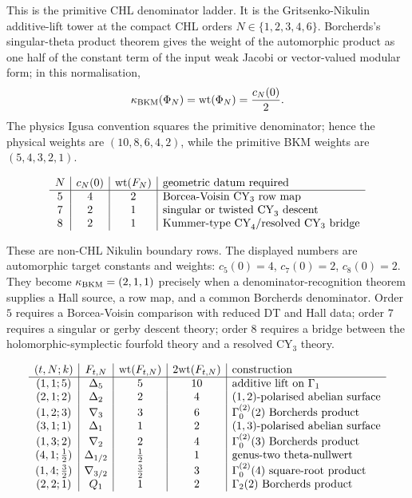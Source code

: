 This is the primitive CHL denominator ladder.  It is the
Gritsenko-Nikulin additive-lift tower at the compact CHL orders
$N\in\{1,2,3,4,6\}$.  Borcherds's singular-theta product theorem gives
the weight of the automorphic product as one half of the constant term
of the input weak Jacobi or vector-valued modular form; in this
normalisation,
\[
  \kappa_{\mathrm{BKM}}(\Phi_N)=\mathrm{wt}(\Phi_N)=\frac{c_N(0)}{2}.
\]
The physics Igusa convention squares the primitive denominator; hence
the physical weights are $(10,8,6,4,2)$, while the primitive BKM
weights are $(5,4,3,2,1)$.

\[
\begin{array}{c|c|c|l}
N & c_N(0) & \wt(F_N) & \text{geometric datum required}\\\hline
5 & 4 & 2 & \text{Borcea-Voisin CY}_3\ \text{row map}\\
7 & 2 & 1 & \text{singular or twisted CY}_3\ \text{descent}\\
8 & 2 & 1 & \text{Kummer-type CY}_4/\text{resolved CY}_3\ \text{bridge}
\end{array}
\]

These are non-CHL Nikulin boundary rows.  The displayed numbers are
automorphic target constants and weights:
$c_5(0)=4$, $c_7(0)=2$, $c_8(0)=2$.  They become
$\kappa_{\mathrm{BKM}}=(2,1,1)$ precisely when a denominator-recognition theorem supplies
a Hall source, a row map, and a common Borcherds denominator.  Order
$5$ requires a Borcea-Voisin comparison with reduced DT and Hall
data; order $7$ requires a singular or gerby descent theory; order $8$
requires a bridge between the holomorphic-symplectic fourfold theory
and a resolved CY$_3$ theory.

\[
\begin{array}{c|c|c|c|l}
(t,N;k) & F_{t,N} & \mathrm{wt}(F_{t,N}) & 2\mathrm{wt}(F_{t,N})
& \text{construction}\\\hline
(1,1;5) & \Delta_5 & 5 & 10 &
  \text{additive lift on }\Gamma_1\\
(2,1;2) & \Delta_2 & 2 & 4 &
  (1,2)\text{-polarised abelian surface}\\
(1,2;3) & \nabla_3 & 3 & 6 &
  \Gamma_0^{(2)}(2)\text{ Borcherds product}\\
(3,1;1) & \Delta_1 & 1 & 2 &
  (1,3)\text{-polarised abelian surface}\\
(1,3;2) & \nabla_2 & 2 & 4 &
  \Gamma_0^{(2)}(3)\text{ Borcherds product}\\
(4,1;\tfrac12) & \Delta_{1/2} & \tfrac12 & 1 &
  \text{genus-two theta-nullwert}\\
(1,4;\tfrac32) & \nabla_{3/2} & \tfrac32 & 3 &
  \Gamma_0^{(2)}(4)\text{ square-root product}\\
(2,2;1) & Q_1 & 1 & 2 &
  \Gamma_2(2)\text{ Borcherds product}
\end{array}
\]

